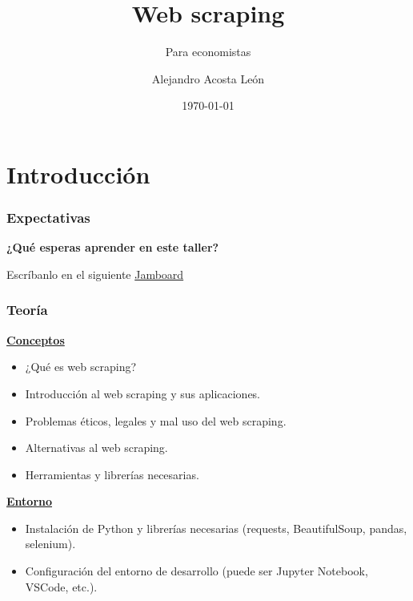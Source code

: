 \documentclass{beamer}
\title{Web scraping}
\subtitle{Para economistas}
\author{Alejandro Acosta León}
\date{\today}
\begin{document}
\maketitle

\section{Introducción}

\begin{frame}
	\frametitle{Expectativas}
	\begin{alertblock}{ }
		\centering
		\textbf{¿Qué esperas aprender en este taller?}
	\end{alertblock}
	\centering
	Escríbanlo en el siguiente \href{https://jamboard.google.com/d/19WqnJKwaRLCvGGu4GEPRmnxqqNuRQeV6afe8qo44bLQ/edit?usp=sharing}{Jamboard}

\end{frame}


\begin{frame}
	\frametitle{Teoría}
	\underline{\textbf{Conceptos}}
	\begin{itemize}
		\item ¿Qué es web scraping?
		\item Introducción al web scraping y sus aplicaciones.
		\item Problemas éticos, legales y mal uso del web scraping.
		\item Alternativas al web scraping.
		\item Herramientas y librerías necesarias.
	\end{itemize}
	
	\underline{\textbf{Entorno}}
	\begin{itemize}
		\item Instalación de Python y librerías necesarias (requests, BeautifulSoup, pandas, selenium).
		\item Configuración del entorno de desarrollo (puede ser Jupyter Notebook, VSCode, etc.).
	\end{itemize}	
	
\end{frame}
\end{document}
